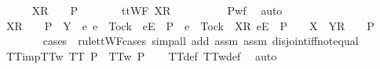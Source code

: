 \ \ \ \ \isamarkupfalse%
\ {\isachardoublequoteopen}{\isacharbrackleft}X{\isacharbrackright}\isactrlsub R\ {\isacharhash}\ {\isasymsigma}\ {\isasymin}\ P{\isachardoublequoteclose}\isanewline
\ \ \ \ \isamarkupfalse%
\ \isamarkupfalse%
\ {\isachardoublequoteopen}ttWF\ {\isacharparenleft}{\isacharbrackleft}X{\isacharbrackright}\isactrlsub R\ {\isacharhash}\ {\isasymsigma}{\isacharparenright}{\isachardoublequoteclose}\isanewline
\ \ \ \ \ \ \isamarkupfalse%
\ P{\isacharunderscore}wf\ \isamarkupfalse%
\ auto\isanewline
\ \ \ \ \isamarkupfalse%
\ \isamarkupfalse%
\ {\isachardoublequoteopen}{\isacharbrackleft}X{\isacharbrackright}\isactrlsub R\ {\isacharhash}\ {\isasymsigma}\ {\isasymin}\ P\ {\isasymLongrightarrow}\ Y\ {\isasyminter}\ {\isacharbraceleft}e{\isachardot}\ e\ {\isasymnoteq}\ Tock\ {\isasymand}\ {\isacharbrackleft}{\isacharbrackleft}e{\isacharbrackright}\isactrlsub E{\isacharbrackright}\ {\isasymin}\ P\ {\isasymor}\ e\ {\isacharequal}\ Tock\ {\isasymand}\ {\isacharbrackleft}{\isacharbrackleft}X{\isacharbrackright}\isactrlsub R{\isacharcomma}\ {\isacharbrackleft}e{\isacharbrackright}\isactrlsub E{\isacharbrackright}\ {\isasymin}\ P{\isacharbraceright}\ {\isacharequal}\ {\isacharbraceleft}{\isacharbraceright}\ {\isasymLongrightarrow}\ {\isacharbrackleft}X\ {\isasymunion}\ Y{\isacharbrackright}\isactrlsub R\ {\isacharhash}\ {\isasymsigma}\ {\isasymin}\ P\ {\isachardoublequoteclose}\isanewline
\ \ \ \ \ \ \isamarkupfalse%
\ {\isacharparenleft}cases\ {\isasymsigma}\ rule{\isacharcolon}ttWF{\isachardot}cases{\isacharcomma}\ simp{\isacharunderscore}all\ add{\isacharcolon}\ assm{}\ assm{}\ disjoint{\isacharunderscore}iff{\isacharunderscore}not{\isacharunderscore}equal{\isacharparenright}\isanewline
\ \ \isamarkupfalse%
\isanewline
{}\isamarkupfalse%
%
\endisatagproof
{\isafoldproof}%
%
\isadelimproof
\isanewline
%
\endisadelimproof
\isanewline
{}\isamarkupfalse%
\ TT{}{\isacharunderscore}imp{\isacharunderscore}TT{}w{\isacharcolon}\ {\isachardoublequoteopen}TT{}\ P\ {\isasymLongrightarrow}\ TT{}w\ P{\isachardoublequoteclose}\isanewline
%
\isadelimproof
\ \ %
\endisadelimproof
%
\isatagproof
{}\isamarkupfalse%
\ TT{}{\isacharunderscore}def\ TT{}w{\isacharunderscore}def\ \isamarkupfalse%
\ auto%
\endisatagproof
{\isafoldproof}%
%
\isadelimproof
\isanewline
